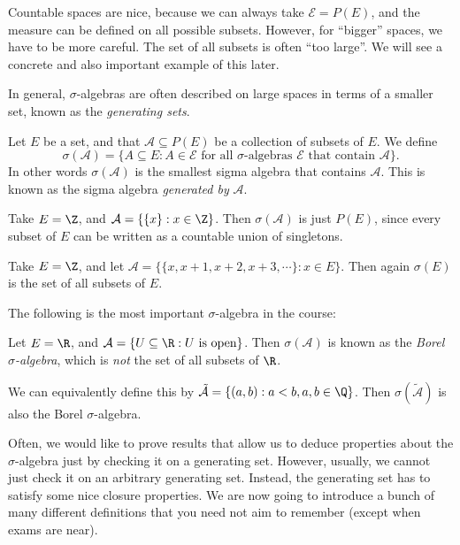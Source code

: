 \documentclass[a4paper]{article}
\begin{document}
Countable spaces are nice, because we can always take $\mathcal{E} = P(E)$, and the measure can be defined on all possible subsets. However, for ``bigger'' spaces, we have to be more careful. The set of all subsets is often ``too large''. We will see a concrete and also important example of this later.

In general, $\sigma$-algebras are often described on large spaces in terms of a smaller set, known as the \emph{generating sets}.
\begin{defi}
  Let $E$ be a set, and that $\mathcal{A} \subseteq P(E)$ be a collection of subsets of $E$. We define
  \[
    \sigma(\mathcal{A}) = \{A \subseteq E: A \in \mathcal{E}\text{ for all $\sigma$-algebras $\mathcal{E}$ that contain $\mathcal{A}$}\}.
  \]
  In other words $\sigma(\mathcal{A})$ is the smallest sigma algebra that contains $\mathcal{A}$. This is known as the sigma algebra \emph{generated by} $\mathcal{A}$.
\end{defi}

\begin{eg}
  Take $E = \Z$, and $\mathcal{A} = \{\{x\}: x \in \Z\}$. Then $\sigma(\mathcal{A})$ is just $P(E)$, since every subset of $E$ can be written as a countable union of singletons.
\end{eg}

\begin{eg}
  Take $E = \Z$, and let $\mathcal{A} = \{ \{x, x + 1, x + 2, x + 3, \cdots\}: x \in E\}$. Then again $\sigma(E)$ is the set of all subsets of $E$.
\end{eg}

The following is the most important $\sigma$-algebra in the course:
\begin{defi}
  Let $E = \R$, and $\mathcal{A} = \{U \subseteq \R: U \text{ is open}\}$. Then $\sigma(\mathcal{A})$ is known as the \emph{Borel $\sigma$-algebra}, which is \emph{not} the set of all subsets of $\R$.

  We can equivalently define this by $\tilde{\mathcal{A}} = \{(a, b): a < b, a, b \in \Q\}$. Then $\sigma(\tilde{\mathcal{A}})$ is also the Borel $\sigma$-algebra.
\end{defi}

Often, we would like to prove results that allow us to deduce properties about the $\sigma$-algebra just by checking it on a generating set. However, usually, we cannot just check it on an arbitrary generating set. Instead, the generating set has to satisfy some nice closure properties. We are now going to introduce a bunch of many different definitions that you need not aim to remember (except when exams are near).
\end{document}
